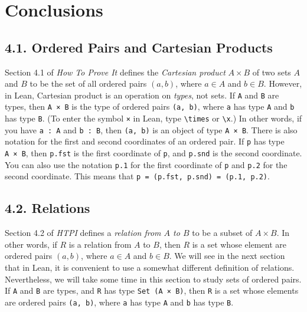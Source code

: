 \documentclass[
  letterpaper,
  DIV=11,
  numbers=noendperiod]{scrreprt}
\theoremstyle{remark}
\begin{document}

\hypertarget{conclusions}{%
\chapter{Conclusions}\label{conclusions}}

\hypertarget{ordered-pairs-and-cartesian-products}{%
\section{4.1. Ordered Pairs and Cartesian
Products}\label{ordered-pairs-and-cartesian-products}}

Section 4.1 of \emph{How To Prove It} defines the \emph{Cartesian
product} \(A \times B\) of two sets \(A\) and \(B\) to be the set of all
ordered pairs \((a, b)\), where \(a \in A\) and \(b \in B\). However, in
Lean, Cartesian product is an operation on \emph{types}, not sets. If
\texttt{A} and \texttt{B} are types, then \texttt{A\ ×\ B} is the type
of ordered pairs \texttt{(a,\ b)}, where \texttt{a} has type \texttt{A}
and \texttt{b} has type \texttt{B}. (To enter the symbol \texttt{×} in
Lean, type \texttt{\textbackslash{}times} or
\texttt{\textbackslash{}x}.) In other words, if you have
\texttt{a\ :\ A} and \texttt{b\ :\ B}, then \texttt{(a,\ b)} is an
object of type \texttt{A\ ×\ B}. There is also notation for the first
and second coordinates of an ordered pair. If \texttt{p} has type
\texttt{A\ ×\ B}, then \texttt{p.fst} is the first coordinate of
\texttt{p}, and \texttt{p.snd} is the second coordinate. You can also
use the notation \texttt{p.1} for the first coordinate of \texttt{p} and
\texttt{p.2} for the second coordinate. This means that
\texttt{p\ =\ (p.fst,\ p.snd)\ =\ (p.1,\ p.2)}.

\hypertarget{relations}{%
\section{4.2. Relations}\label{relations}}

Section 4.2 of \emph{HTPI} defines a \emph{relation from \(A\) to \(B\)}
to be a subset of \(A \times B\). In other words, if \(R\) is a relation
from \(A\) to \(B\), then \(R\) is a set whose element are ordered pairs
\((a, b)\), where \(a \in A\) and \(b \in B\). We will see in the next
section that in Lean, it is convenient to use a somewhat different
definition of relations. Nevertheless, we will take some time in this
section to study sets of ordered pairs. If \texttt{A} and \texttt{B} are
types, and \texttt{R} has type \texttt{Set\ (A\ ×\ B)}, then \texttt{R}
is a set whose elements are ordered pairs \texttt{(a,\ b)}, where
\texttt{a} has type \texttt{A} and \texttt{b} has type \texttt{B}.
\end{document}
